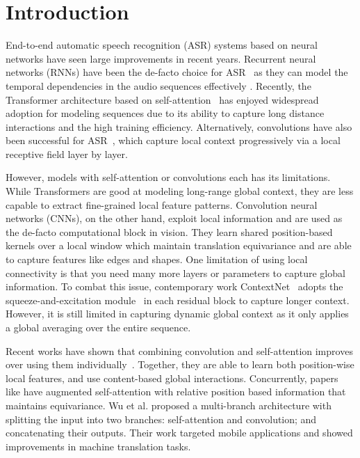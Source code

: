 \section{Introduction}
End-to-end automatic speech recognition (ASR) systems based on neural networks have seen large improvements in recent years.
Recurrent neural networks (RNNs) have been the de-facto choice for ASR~\cite{chiu2018state, rao2017exploring, Ryan19, tara2020} as they can model the temporal dependencies in the audio sequences effectively \cite{graves2012sequence}. Recently, the Transformer architecture based on self-attention~\cite{vaswani2017attention, zhang2020transformer} has enjoyed widespread adoption for modeling sequences due to its ability to capture long distance interactions and the high training efficiency. Alternatively, convolutions have also been successful for ASR~\cite{li2019jasper, kriman2019quartznet, han2020contextnet, sainath2013deep, abdel2014convolutional}, which capture local context progressively via a local receptive field layer by layer. 


However, models with self-attention or convolutions each has its limitations. While Transformers are good at modeling long-range global context, they are less capable to extract fine-grained local feature patterns. Convolution neural networks (CNNs), on the other hand, exploit local information and are used as the de-facto computational block in vision. They learn shared position-based kernels over a local window which maintain translation equivariance and are able to capture features like edges and shapes. One limitation of using local connectivity is that you need many more layers or parameters to capture global information. To combat this issue, contemporary work ContextNet~\cite{han2020contextnet} adopts the squeeze-and-excitation module~\cite{hu2018squeeze} in each residual block to capture longer context. However, it is still limited in capturing dynamic global context as it only applies a global averaging over the entire sequence.

Recent works have shown that combining convolution and self-attention improves over using them individually~\cite{bello2019attention}. Together, they are able to learn both position-wise local features, and use content-based global interactions. Concurrently, papers like \cite{yang2019convolutional, yu2018qanet} have augmented self-attention with relative position based information that maintains equivariance. Wu et al. \cite{wu2020lite} proposed a multi-branch architecture with splitting the input into two branches: self-attention and convolution; and concatenating their outputs. Their work targeted mobile applications and showed improvements in machine translation tasks.

